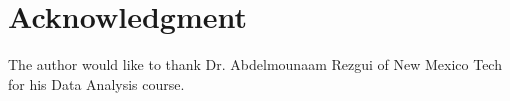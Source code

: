 \documentclass[journal]{IEEEtran}
\begin{document}
\appendices



\section*{Acknowledgment}


The author would like to thank Dr. Abdelmounaam Rezgui of New Mexico Tech for his Data Analysis course.


\ifCLASSOPTIONcaptionsoff
  \newpage
\fi





%
%
%


\end{document}
